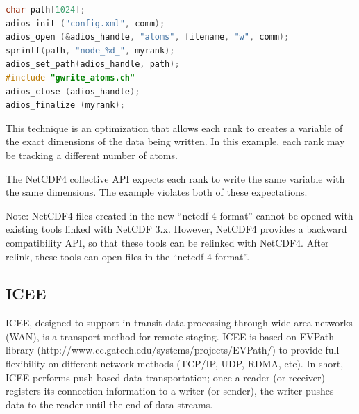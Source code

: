 \begin{lstlisting}[language=C, caption=Example C source]
char path[1024];
adios_init ("config.xml", comm);
adios_open (&adios_handle, "atoms", filename, "w", comm); 
sprintf(path, "node_%d_", myrank); 
adios_set_path(adios_handle, path);
#include "gwrite_atoms.ch" 
adios_close (adios_handle); 
adios_finalize (myrank);
\end{lstlisting}

This technique is an optimization that allows each rank to creates a variable of 
the exact dimensions of the data being written.  In this example, each rank may 
be tracking a different number of atoms.

The NetCDF4 collective API expects each rank to write the same variable with the 
same dimensions.  The example violates both of these expectations.

Note: NetCDF4 files created in the new ``netcdf-4 format'' cannot be opened with 
existing tools linked with NetCDF 3.x.  However, NetCDF4 provides a backward compatibility 
API, so that these tools can be relinked with NetCDF4.  After relink, these tools 
can open files in the ``netcdf-4 format''.

\subsection{ICEE}
ICEE, designed to support in-transit data processing through wide-area networks (WAN), is a transport method for remote staging. ICEE is based on EVPath library (http://www.cc.gatech.edu/systems/projects/EVPath/) to provide full flexibility on different network methods (TCP/IP, UDP, RDMA, etc). In short, ICEE performs push-based data transportation; once a reader (or receiver) registers its connection information to a writer (or sender), the writer pushes data to the reader until the end of data streams.

